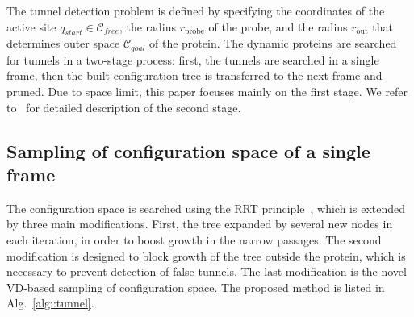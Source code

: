 \documentclass{llncs}
\def\qstart{q_{start}}
\def\qinit{\qstart}
\def\CF{\mathcal{C}_{free}}
\def\probe{r_{\mathrm{probe}}}
\def\Sprobe{S_{\mathrm{probe}}}
\def\gprobe{r_{\mathrm{out}}}
\def\Sgprobe{S_{\mathrm{out}}}
\def\CG{\mathcal{C}_{goal}}
\begin{document}
The tunnel detection problem is defined by specifying the coordinates of the active site $\qinit \in \CF$, 
    the radius $\probe$ of the probe, and the radius 
$\gprobe$ that determines outer space $\CG$ of the protein.
The dynamic proteins are searched for tunnels in a two-stage process: first, the tunnels are searched in a single frame, then the
built configuration tree is transferred to the next frame and pruned.
Due to space limit, this paper focuses mainly on the first stage. 
We refer to~\cite{vonasek2016application} for detailed description of the second stage.

\subsection{Sampling of configuration space of a single frame}


The configuration space is searched using the RRT principle~\cite{lavalleRRT}, which is extended by three main modifications.
First, the tree expanded by several new nodes in each iteration, in order to boost growth in the narrow passages.
The second modification is designed to block growth of the tree outside the protein, which is necessary to prevent detection of false
tunnels. 
The last modification is the novel VD-based sampling of configuration space.
The proposed method is listed in Alg.~\ref{alg::tunnel}.
\end{document}
